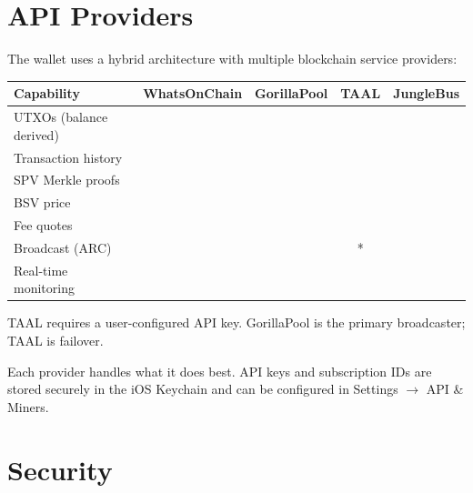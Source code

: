 \documentclass[a4paper, 11pt, openany]{book}
\newcommand{\cmark}{\textcolor{forthGreen}{\ding{51}}}%
\newcommand{\xmark}{\textcolor{forthGrey}{\ding{55}}}%
\begin{document}
\section{API Providers}

The wallet uses a hybrid architecture with multiple blockchain service providers:

\begin{center}
\begin{tabular}{@{} l c c c c @{}}
\toprule
\textbf{Capability}      & \textbf{WhatsOnChain} & \textbf{GorillaPool} & \textbf{TAAL} & \textbf{JungleBus} \\
\midrule
UTXOs (balance derived)   & \cmark & \xmark & \xmark & \xmark \\
Transaction history       & \cmark & \xmark & \xmark & \cmark \\
SPV Merkle proofs         & \cmark & \xmark & \xmark & \xmark \\
BSV price                 & \cmark & \xmark & \xmark & \xmark \\
Fee quotes                & \xmark & \cmark & \cmark & \xmark \\
Broadcast (ARC)           & \xmark & \cmark & \cmark* & \xmark \\
Real-time monitoring      & \xmark & \xmark & \xmark & \cmark \\
\bottomrule
\end{tabular}

\noindent *TAAL requires a user-configured API key. GorillaPool is the primary broadcaster; TAAL is failover.
\end{center}

Each provider handles what it does best. API keys and subscription IDs are stored securely in the iOS Keychain and can be configured in Settings $\rightarrow$ API \& Miners.

\section{Security}
\end{document}
